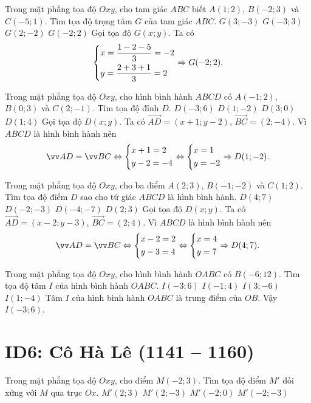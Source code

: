 \begin{ex}%
	Trong mặt phẳng tọa độ $Oxy$, cho tam giác $ABC$ biết $A(1;2)$, $B(-2;3)$ và $C(-5;1)$. Tìm tọa độ trọng tâm $G$ của tam giác $ABC$.
	\choice
	{$G(3;-3)$}
	{$G(-3;3)$}
	{$G(2;-2)$}
	{\True $G(-2;2)$}
	\loigiai
	{
		Gọi tọa độ $G(x;y)$. Ta có
		\[\left\{\begin{aligned}&x=\dfrac{1-2-5}{3}=-2\\ &y=\dfrac{2+3+1}{3}=2\end{aligned}\right.\Rightarrow G(-2;2).\]
	}			
\end{ex}

\begin{ex}%
	Trong mặt phẳng tọa độ $Oxy$, cho hình bình hành $ABCD$ có $A(-1;2)$, $B(0;3)$ và $C(2;-1)$. Tìm tọa độ đỉnh $D$.
	\choice
	{$D(-3;6)$}
	{\True $D(1;-2)$}
	{$D(3;0)$}
	{$D(1;4)$}
	\loigiai
	{
		Gọi tọa độ $D(x;y)$. Ta có $\vec{AD}=(x+1;y-2)$, $\vec{BC}=(2;-4)$. Vì $ABCD$ là hình bình hành nên
		\[\vec{AD}=\vec{BC}\Leftrightarrow \heva{&x+1=2\\ &y-2=-4}\Leftrightarrow \heva{&x=1\\ &y=-2}\Rightarrow D(1;-2).\]
	}	
\end{ex}

\begin{ex}%
	Trong mặt phẳng tọa độ $Oxy$, cho ba điểm $A(2;3)$, $B(-1;-2)$ và $C(1;2)$. Tìm tọa độ điểm $D$  sao cho tứ giác $ABCD$ là hình bình hành.
	\choice
	{\True$D(4;7)$}
	{$D(-2;-3)$}
	{$D(-4;-7)$}
	{$D(2;3)$}
	\loigiai
	{
		Gọi tọa độ $D(x;y)$. Ta có $\vec{AD}=(x-2;y-3)$, $\vec{BC}=(2;4)$. Vì $ABCD$ là hình bình hành nên
		\[\vec{AD}=\vec{BC}\Leftrightarrow \heva{&x-2=2\\ &y-3=4}\Leftrightarrow \heva{&x=4\\ &y=7}\Rightarrow D(4;7).\]
	}	
\end{ex}

\begin{ex}%
	Trong mặt phẳng tọa độ $Oxy$, cho hình bình hành $OABC$ có $B(-6;12)$. Tìm tọa độ tâm $I$ của hình bình hành $OABC$.
	\choice
	{\True $I(-3;6)$}
	{$I(-1;4)$}
	{$I(3;-6)$}
	{$I(1;-4)$}
	\loigiai
	{
		Tâm $I$ của hình bình hành $OABC$ là trung điểm của $OB$. Vậy $I(-3;6)$.
	}		
\end{ex}




\section*{ID6: Cô Hà Lê (1141 -- 1160)}
\begin{ex}%
	Trong mặt phẳng tọa độ $Oxy$, cho điểm $M(-2;3)$. Tìm tọa độ điểm $M'$ đối xứng với $M$ qua trục $Ox$.
	\choice
	{$M'(2;3)$}
	{$M'(2;-3)$}
	{$M'(-2;0)$}
	{\True $M'(-2;-3)$}
\end{ex}

